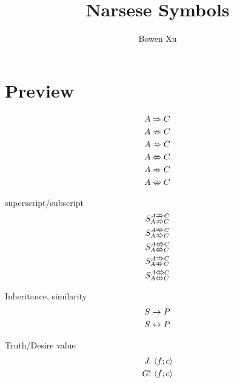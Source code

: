 \documentclass{article}
\title{Narsese Symbols}
\author{Bowen Xu}
\begin{document}
\maketitle

\section*{Preview}

\begin{equation*}
\begin{aligned}
    A \Rightarrow C \\
    A \predimply C \\
    A \retrimply C \\
    A \predequiv C \\
    A \concimply C \\
    A \concequiv C
\end{aligned}
\end{equation*}

superscript/subscript
\begin{equation*}
\begin{aligned}
    S_{A \predimply C}^{{A \predimply C}} \\
    S_{A \retrimply C}^{{A \retrimply C}} \\
    S_{A \predequiv C}^{{A \predequiv C}} \\
    S_{A \concimply C}^{{A \concimply C}} \\
    S_{A \concequiv C}^{{A \concequiv C}} \\
\end{aligned}
\end{equation*}

Inheritance, similarity
\begin{equation*}
\begin{aligned}
    S \mathrel{\rightarrow} P \\
    S \mathrel{\leftrightarrow} P
\end{aligned}
\end{equation*}

Truth/Desire value
\begin{equation*}
\begin{aligned}
    J. ~\langle f; c \rangle \\
    G! ~\langle f; c \rangle
\end{aligned}
\end{equation*}
\end{document}
